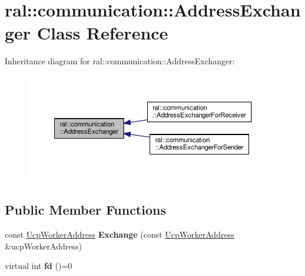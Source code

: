 \hypertarget{classral_1_1communication_1_1AddressExchanger}{}\section{ral\+:\+:communication\+:\+:Address\+Exchanger Class Reference}
\label{classral_1_1communication_1_1AddressExchanger}


Inheritance diagram for ral\+:\+:communication\+:\+:Address\+Exchanger\+:\nopagebreak
\begin{figure}[H]
\begin{center}
\leavevmode
\includegraphics[width=350pt]{classral_1_1communication_1_1AddressExchanger__inherit__graph}
\end{center}
\end{figure}
\subsection*{Public Member Functions}
\begin{DoxyCompactItemize}
\item 
\mbox{\label{classral_1_1communication_1_1AddressExchanger_a3bb71364f0c14281838adda5d6a90c5e}} 
const \hyperlink{classral_1_1communication_1_1UcpWorkerAddress}{Ucp\+Worker\+Address} {\bfseries Exchange} (const \hyperlink{classral_1_1communication_1_1UcpWorkerAddress}{Ucp\+Worker\+Address} \&ucp\+Worker\+Address)
\item 
\mbox{\label{classral_1_1communication_1_1AddressExchanger_a471d68aeb123276a007fde516ae9bc15}} 
virtual int {\bfseries fd} ()=0
\end{DoxyCompactItemize}
